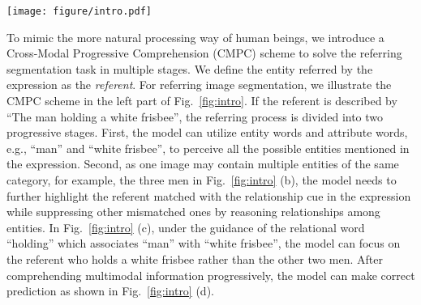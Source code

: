 \documentclass[10pt,journal,cspaper,compsoc]{IEEEtran}
\begin{document}
\begin{figure*}[t]
   \begin{center}
      \texttt{[image: figure/intro.pdf]}
   \end{center}
      \caption{Illustration of our progressive referring segmentation method on image and video data. 
      (a)(e) Input referring expression, image and video. 
      (b)(f) Our model first perceives all the entities 
      described in the expression based on entity words and attribute words, e.g., ``man'', ``white frisbee'' and ``girl'' (orange masks and blue outline). 
      (c)(f) After finding out all the candidate entities that may be referred by the input expression, our model exploits relational word, e.g., ``holding'' and ``in'', to highlight the entity involved with the relationship (green arrow) and suppress the others which are not involved. 
      (g) For video data, our model further utilizes action word ``bouncing'' to aggregate temporal context information from neighbor frames for better localizing the referent in a changing video. 
      (d)(h) Based on the progressive comprehension results, our model can finally determine the referent as output (purple mask). (Best viewed in color).}
   \label{fig:intro}
\end{figure*}

To mimic the more natural processing way of human beings, we introduce a Cross-Modal Progressive Comprehension (CMPC) scheme to solve the referring segmentation task in multiple stages. 
We define the entity referred by the expression as the \textit{referent}. 
For referring image segmentation, we illustrate the CMPC scheme in the left part of Fig.~\ref{fig:intro}. 
If the referent is described by ``The man holding a white frisbee'', the referring process is divided into two progressive stages. 
First, the model can utilize entity words and attribute words, e.g., ``man'' and ``white frisbee'', to perceive all the possible entities mentioned in the expression. Second, as one image may contain multiple entities of the same category, for example, the three men in Fig.~\ref{fig:intro} (b), the model needs to further highlight the referent matched with the relationship cue in the expression while suppressing other mismatched ones by reasoning relationships among entities. 
In Fig.~\ref{fig:intro} (c), under the guidance of the relational word ``holding'' which associates ``man'' with ``white frisbee'', the model can focus on the referent who holds a white frisbee rather than the other two men.
After comprehending multimodal information progressively, the model can make correct prediction as shown in Fig.~\ref{fig:intro} (d).
\end{document}
